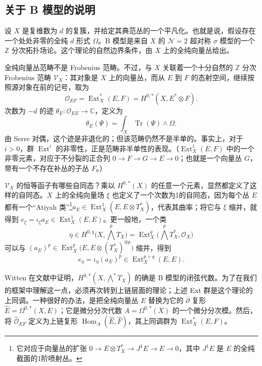 \subsection{关于 B 模型的说明}\label{sec:2.5.3}

设 $X$ 是复维数为 $d$ 的复簇，并给定其典范丛的一个平凡化。也就是说，假设存在一个处处非零的全纯 $d$ 形式 $\Omega$。B 模型是来自 $X$ 的 $\mathcal{N}=2$ 超对称 $\sigma$ 模型的一个 $\mathbb{Z}$ 分次拓扑场论。这个理论的自然边界条件，由 $X$ 上的全纯向量丛给出。

全纯向量丛范畴不是 Frobenius 范畴。不过，与 $X$ 关联着一个十分自然的 $\mathbb{Z}$ 分次 Frobenius 范畴 $\mathcal{V}_X$：其对象是 $X$ 上的向量丛，而从 $E$ 到 $F$ 的态射空间，继续按照源对象在前的记号，取为
\begin{equation}\label{eq:2.78}
\mathcal{O}_{EF}=\operatorname{Ext}_X^*(E,F)=H^{0,*}(X,E^*\otimes F).
\end{equation}
次数为 $-d$ 的迹 $\theta_E\colon\mathcal{O}_{EE}\to\mathbb{C}$，定义为
\begin{equation}\label{eq:2.79}
\theta_E(\Psi)=\int_X\operatorname{Tr}(\Psi)\wedge\Omega.
\end{equation}
由 Serre 对偶，这个迹是非退化的；但该范畴仍然不是半单的。事实上，对于 $i>0$，群 $\operatorname{Ext}^i$ 的非零性，正是范畴非半单性的表现。（$\operatorname{Ext}_X^1(E,F)$ 中的一个非零元素，对应于不分裂的正合列 $0\to F\to G\to E\to0$；也就是一个向量丛 $G$，带有一个不存在补丛的子丛 $F$。）

$\mathcal{V}_X$ 的恒等函子有哪些自同态？乘以 $H^{0,*}(X)$ 的任意一个元素，显然都定义了这样的自同态。$X$ 上的全纯向量场 $\xi$ 也定义了一个次数为1的自同态，因为每个丛 $E$ 都有一个“Atiyah 类”\footnote{它对应于向量丛的扩张 $0\to E\otimes T_X^*\to J^1E\to E\to0$，其中 $J^1E$ 是 $E$ 的全纯截面的1阶喷射丛。}$a_E\in\operatorname{Ext}_X^1(E,E\otimes T_X^*)$，代表其曲率；将它与 $\xi$ 缩并，就得到 $e_\xi=\iota_\xi a_E\in\operatorname{Ext}_X^1(E,E)$。更一般地，一个类
\[
\eta\in H^{0,q}\bigl(X,\textstyle\bigwedge^pT_X\bigr)
=\operatorname{Ext}_X^q\bigl(\textstyle\bigwedge^pT_X^*,\mathcal{O}_X\bigr)
\]
可以与 $(a_E)^p\in\operatorname{Ext}_X^p\bigl(E,E\otimes(T_X^*)^{\otimes p}\bigr)$ 缩并，得到
\[
e_\eta=\iota_\eta(a_E)^p\in\operatorname{Ext}_X^{p+q}(E,E).
\]

Witten 在文献中证明，$H^{0,*}(X,\bigwedge^*T_X)$ 的确是 B 模型的闭弦代数。为了在我们的框架中理解这一点，必须再次转到上链层面的理论；上述 Ext 群是这个理论的上同调。一种很好的办法，是把全纯向量丛 $E$ 替换为它的 $\overline{\partial}$ 复形 $\widehat{E}=\Omega^{0,*}(X,E)$；它是微分分次代数 $A=\Omega^{0,*}(X)$ 的一个微分分次模。然后，将 $\widehat{\mathcal{O}}_{EF}$ 定义为上链复形 $\operatorname{Hom}_A(\widehat{E},\widehat{F})$，其上同调群为 $\operatorname{Ext}_X^*(E,F)$。

